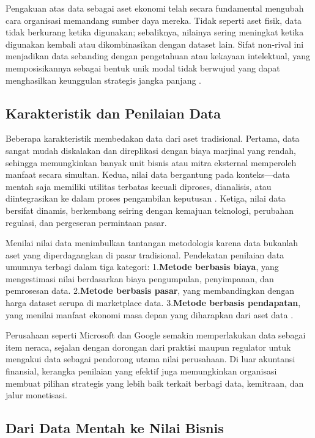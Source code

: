 Pengakuan atas data sebagai aset ekonomi telah secara fundamental mengubah cara organisasi memandang sumber daya mereka. Tidak seperti aset fisik, data tidak berkurang ketika digunakan; sebaliknya, nilainya sering meningkat ketika digunakan kembali atau dikombinasikan dengan dataset lain. Sifat non-rival ini menjadikan data sebanding dengan pengetahuan atau kekayaan intelektual, yang memposisikannya sebagai bentuk unik modal tidak berwujud yang dapat menghasilkan keunggulan strategis jangka panjang \cite{hagiu2016marketplace,shapiro1999information}.

\subsection{Karakteristik dan Penilaian Data}

Beberapa karakteristik membedakan data dari aset tradisional. Pertama, data sangat mudah diskalakan dan direplikasi dengan biaya marjinal yang rendah, sehingga memungkinkan banyak unit bisnis atau mitra eksternal memperoleh manfaat secara simultan. Kedua, nilai data bergantung pada konteks—data mentah saja memiliki utilitas terbatas kecuali diproses, dianalisis, atau diintegrasikan ke dalam proses pengambilan keputusan \cite{smith2016data,redman2018seizing}. Ketiga, nilai data bersifat dinamis, berkembang seiring dengan kemajuan teknologi, perubahan regulasi, dan pergeseran permintaan pasar.

Menilai nilai data menimbulkan tantangan metodologis karena data bukanlah aset yang diperdagangkan di pasar tradisional. Pendekatan penilaian data umumnya terbagi dalam tiga kategori:  
1.\textbf{Metode berbasis biaya}, yang mengestimasi nilai berdasarkan biaya pengumpulan, penyimpanan, dan pemrosesan data.  
2.\textbf{Metode berbasis pasar}, yang membandingkan dengan harga dataset serupa di marketplace data.  
3.\textbf{Metode berbasis pendapatan}, yang menilai manfaat ekonomi masa depan yang diharapkan dari aset data \cite{krasadakis2020data,abbas2019towards}.  

Perusahaan seperti Microsoft dan Google semakin memperlakukan data sebagai item neraca, sejalan dengan dorongan dari praktisi maupun regulator untuk mengakui data sebagai pendorong utama nilai perusahaan. Di luar akuntansi finansial, kerangka penilaian yang efektif juga memungkinkan organisasi membuat pilihan strategis yang lebih baik terkait berbagi data, kemitraan, dan jalur monetisasi.

\subsection{Dari Data Mentah ke Nilai Bisnis}

